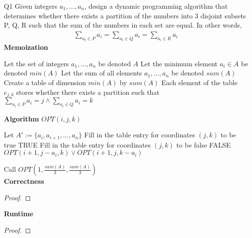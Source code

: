 \begin{problem}
  {Q1}
  Given integers $a_1, \dots , a_n$, design a dynamic programming algorithm that determines
  whether there exists a partition of the numbers into 3 disjoint subsets P, Q, R such that the sum
  of the numbers in each set are equal. In other words,
  \begin{align*}
      \sum_{a_i \in P} a_i = \sum_{a_i \in Q} a_i = \sum_{a_i \in R} a_i
  \end{align*}
  \noindent
  \textbf{Memoization}
  \begin{algorithmic}[1]
    \STATE Let the set of integers $a_1, \dots, a_n$ be denoted $A$
    \STATE Let the minimum element $a_i \in A$ be denoted $min(A)$
    \STATE Let the sum of all elements $a_1, \dots, a_n$ be denoted $sum(A)$
    \STATE Create a table of dimension $min(A)$ by $sum(A)$
    \STATE Each element of the table $e_{j, k}$ stores whether there exists a partition such that
           $\sum_{a_i \in P} a_i = j \land \sum_{a_i \in Q} a_i = k$
  \end{algorithmic}
  \noindent
  \textbf{Algorithm}
  $OPT(i, j, k)$
  \begin{algorithmic}[1]
    \STATE Let $A' := \{a_i, a_{i+1}, \dots, a_n\}$
    \STATE Fill in the table entry for coordinates $(j, k)$ to be true
    \RETURN TRUE
    \STATE Fill in the table entry for coordinates $(j, k)$ to be false
    \RETURN FALSE
    \ENDIF
    \RETURN $OPT(i+1, j-a_i, k) \lor OPT(i+1, j, k-a_i)$
  \end{algorithmic}
  Call $OPT(1, \frac{sum(A)}{3}, \frac{sum(A)}{3})$ \\
  \textbf{Correctness}
  \begin{proof}
  \end{proof}
  \noindent
  \textbf{Runtime}
  \begin{proof}
  \end{proof}
\end{problem}
